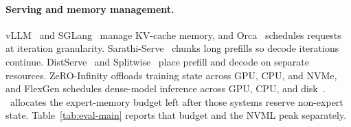 \paragraph{Serving and memory management.}
vLLM~\cite{kwon2023vllm} and SGLang~\cite{zheng2024sglang} manage KV-cache memory, and Orca~\cite{yu2022orca} schedules requests at iteration granularity.
Sarathi-Serve~\cite{agrawal2024sarathi} chunks long prefills so decode iterations continue.
DistServe~\cite{zhong2024distserve} and Splitwise~\cite{patel2024splitwise} place prefill and decode on separate resources.
ZeRO-Infinity offloads training state across GPU, CPU, and NVMe, and FlexGen schedules dense-model inference across GPU, CPU, and disk~\cite{rajbhandari2021zeroinfinity,sheng2023flexgen}.
\systemname\ allocates the expert-memory budget left after those systems reserve non-expert state.
Table~\ref{tab:eval-main} reports that budget and the NVML peak separately.
